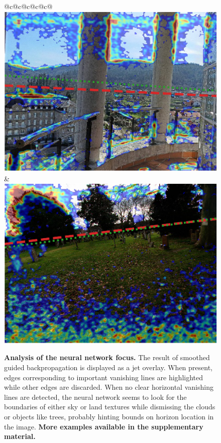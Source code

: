 \begin{figure}
\begin{tabular}{@{}c@{}c@{}c@{}c@{}c@{}}
\includegraphics[width=\sgbpwidth\linewidth]{figures/nn_analysis/sgbp/pano_addontedcyafqk_jpg-6.png} &
\includegraphics[width=\sgbpwidth\linewidth]{figures/nn_analysis/sgbp/pano_addhxkomphqrlr_jpg-4.png} \\
\end{tabular}
\egroup
\def\arraystretch{0.5} %
\caption[Analysis of the neural network focus]{\textbf{Analysis of the neural network focus.} The result of smoothed guided backpropagation is displayed as a jet overlay. When present, edges corresponding to important vanishing lines are highlighted while other edges are discarded. When no clear horizontal vanishing lines are detected, the neural network seems to look for the boundaries of either sky or land textures while dismissing the clouds or objects like trees, probably hinting bounds on horizon location in the image. \textbf{More examples available in the supplementary material.}}
\label{fig:nn_analysis_smoothed-guided-back-propagation}
\end{figure}


